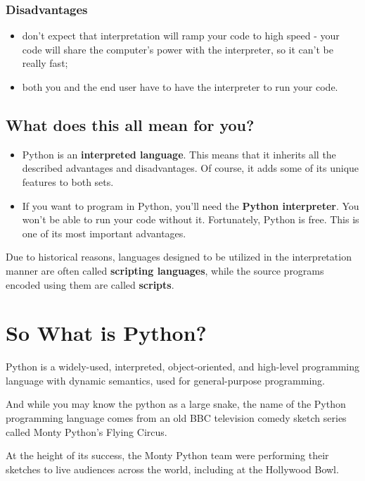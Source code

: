 \documentclass[a4paper,10pt]{article}
\begin{document}
\subsubsection{Disadvantages}
\begin{itemize}
 \item don't expect that interpretation will ramp your code to high speed - your code will share the computer's power with the interpreter, so it can't be really fast;
 \item both you and the end user have to have the interpreter to run your code.
\end{itemize}





\subsection{What does this all mean for you?}
\begin{itemize}
 \item Python is an \textbf{interpreted language}. This means that it inherits all the described advantages and disadvantages. Of course, it adds some of its unique features to both sets.
 \item If you want to program in Python, you'll need the \textbf{Python interpreter}. You won't be able to run your code without it. Fortunately, Python is free. This is one of its most important advantages.
\end{itemize}

Due to historical reasons, languages designed to be utilized in the interpretation manner are often called \textbf{scripting languages}, while the source programs encoded using them are called \textbf{scripts}.


\section{So What is Python?}
Python is a widely-used, interpreted, object-oriented, and high-level programming language with dynamic semantics, used for general-purpose programming.
\newline

And while you may know the python as a large snake, the name of the Python programming language comes from an old BBC television comedy sketch series called Monty Python's Flying Circus.
\newline

At the height of its success, the Monty Python team were performing their sketches to live audiences across the world, including at the Hollywood Bowl.
\newline
\end{document}
